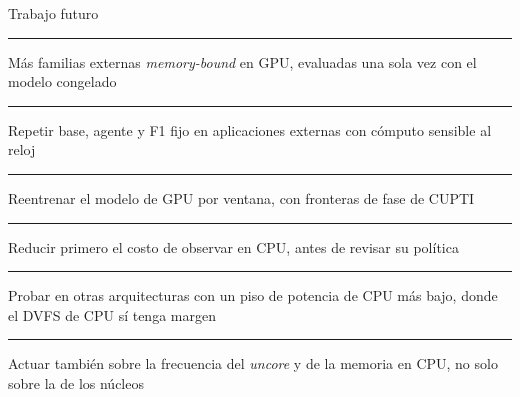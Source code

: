 \newcommand{\vineta}[1]{\par\vspace{1.6mm}\noindent\textcolor{uisgreen}{\rule[0.5ex]{1.6mm}{1.6mm}}\hspace{2mm}#1}

\begin{frame}{Trabajo futuro}
  \vspace{4mm}
  \begin{cardhi}[width=0.86\textwidth,center]
    \small
    \vineta{Más familias externas \textit{memory-bound} en GPU, evaluadas una sola vez con el modelo congelado}
    \vineta{Repetir base, agente y F1 fijo en aplicaciones externas con cómputo sensible al reloj}
    \vineta{Reentrenar el modelo de GPU por ventana, con fronteras de fase de CUPTI}
    \vineta{Reducir primero el costo de observar en CPU, antes de revisar su política}
    \vineta{Probar en otras arquitecturas con un piso de potencia de CPU más bajo, donde el DVFS de CPU sí tenga margen}
    \vineta{Actuar también sobre la frecuencia del \textit{uncore} y de la memoria en CPU, no solo sobre la de los núcleos}
  \end{cardhi}
\end{frame}
